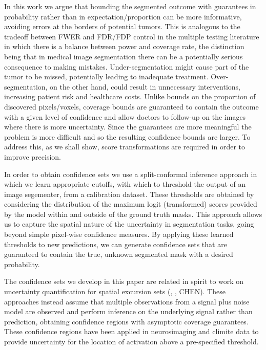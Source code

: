 In this work we argue that bounding the segmented outcome with guarantees in probability rather than in expectation/proportion can be more informative, avoiding errors at the borders of potential tumors. This is analogous to the tradeoff between FWER and FDR/FDP control in the multiple testing literature in which there is a balance between power and coverage rate, the distinction being that in medical image segmentation there can be a potentially serious consequence to making mistakes. Under-segmentation might cause part of the tumor to be missed, potentially leading to inadequate treatment. Over-segmentation, on the other hand, could result in unnecessary interventions, increasing patient risk and healthcare costs. Unlike bounds on the proportion of discovered pixels/voxels, coverage bounds are guaranteed to contain the outcome with a given level of confidence and allow doctors to follow-up on the images where there is more uncertainty. Since the guarantees are more meaningful the problem is more difficult and so the resulting confidence bounds are larger. To address this, as we shall show, score transformations are required in order to improve precision. 

In order to obtain confidence sets we use a split-conformal inference approach in which we learn appropriate cutoffs, with which to threshold the output of an image segementer, from a calibration dataset. These thresholds are obtained by considering the distribution of the maximum logit (transformed) scores provided by the model within and outside of the ground truth masks. This approach allows us to capture the spatial nature of the uncertainty in segmentation tasks, going beyond simple pixel-wise confidence measures. By applying these learned thresholds to new predictions, we can generate confidence sets that are guaranteed to contain the true, unknown segmented mask with a desired probability. 

The confidence sets we develop in this paper are related in spirit to work on uncertainty quantification for spatial excursion sets (\cite{Bowring2019}, \cite{Mejia2019}, CHEN). These approaches instead assume that multiple observations from a signal plus noise model are observed and perform inference on the underlying signal rather than prediction, obtaining confidence regions with asymptotic coverage guarantees. These confidence regions have been applied in neurosimaging \citep{Bowring2019} and climite data \cite{Ren} to provide uncertainty for the location of activation above a pre-specified threshold. 


